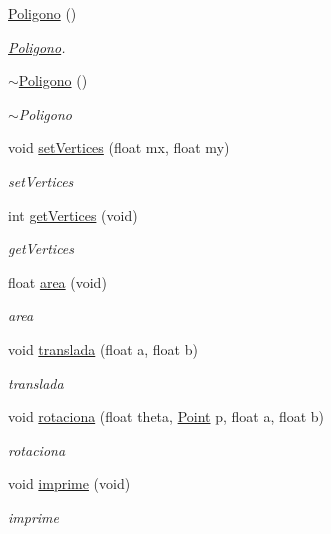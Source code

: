 \begin{DoxyCompactItemize}
\item 
\mbox{\label{class_poligono_a9311a9a1496878c09c8508b3636e2870}} 
\mbox{\hyperlink{class_poligono_a9311a9a1496878c09c8508b3636e2870}{Poligono}} ()
\begin{DoxyCompactList}\small\item\em \mbox{\hyperlink{class_poligono}{Poligono}}. \end{DoxyCompactList}\item 
\mbox{\label{class_poligono_a4dd7136ee506cb4355cbdc724c55a4a0}} 
\mbox{\hyperlink{class_poligono_a4dd7136ee506cb4355cbdc724c55a4a0}{$\sim$\+Poligono}} ()
\begin{DoxyCompactList}\small\item\em $\sim$\+Poligono \end{DoxyCompactList}\item 
void \mbox{\hyperlink{class_poligono_aa67788dbd280dd16b3a3f03870844f26}{set\+Vertices}} (float mx, float my)
\begin{DoxyCompactList}\small\item\em set\+Vertices \end{DoxyCompactList}\item 
int \mbox{\hyperlink{class_poligono_a26a3c5ded9660c3389f9a9535700fa5d}{get\+Vertices}} (void)
\begin{DoxyCompactList}\small\item\em get\+Vertices \end{DoxyCompactList}\item 
float \mbox{\hyperlink{class_poligono_a9b7cb6c339f78a5b9432494d8f94816c}{area}} (void)
\begin{DoxyCompactList}\small\item\em area \end{DoxyCompactList}\item 
void \mbox{\hyperlink{class_poligono_adbf605dfd0419b7301c9be0ec1dbe41b}{translada}} (float a, float b)
\begin{DoxyCompactList}\small\item\em translada \end{DoxyCompactList}\item 
void \mbox{\hyperlink{class_poligono_ab50d539e92a775b56c4b70ff52830516}{rotaciona}} (float theta, \mbox{\hyperlink{class_point}{Point}} p, float a, float b)
\begin{DoxyCompactList}\small\item\em rotaciona \end{DoxyCompactList}\item 
\mbox{\label{class_poligono_a9e4ab006eceed5bc68d3175127a200e0}} 
void \mbox{\hyperlink{class_poligono_a9e4ab006eceed5bc68d3175127a200e0}{imprime}} (void)
\begin{DoxyCompactList}\small\item\em imprime \end{DoxyCompactList}\end{DoxyCompactItemize}


